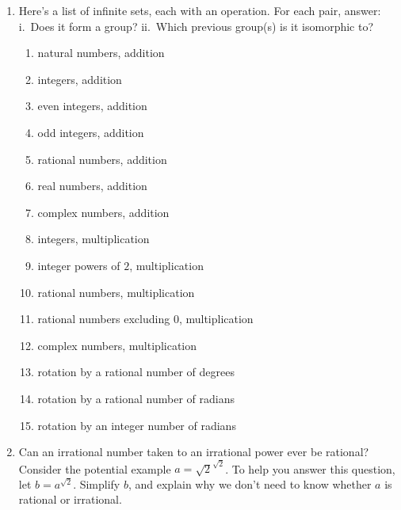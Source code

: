 \documentclass[../gatm.tex]{subfiles}
\begin{document}
\begin{enumerate}
\setcounter{enumi}{\value{inf_problem_i}}
\item Here’s a list of infinite sets, each with an operation. For each pair, answer: i.~Does it form a group? ii.~Which previous group(s) is it isomorphic to?
\begin{enumerate}
\item natural numbers, addition
\item integers, addition
\item even integers, addition
\item odd integers, addition
\item rational numbers, addition
\item real numbers, addition
\item complex numbers, addition
\item integers, multiplication
\item integer powers of $2$, multiplication
\item rational numbers, multiplication
\item rational numbers excluding 0, multiplication
\item complex numbers, multiplication
\item rotation by a rational number of degrees
\item rotation by a rational number of radians
\item rotation by an integer number of radians
\end{enumerate}
\item Can an irrational number taken to an irrational power ever be rational? Consider the potential example $a = \sqrt{2}^{\sqrt{2}}$. To help you answer this question, let $b = a^{\sqrt{2}}$. Simplify $b$, and explain why we don’t need to know whether $a$ is rational or irrational.
\end{enumerate}
\end{document}
